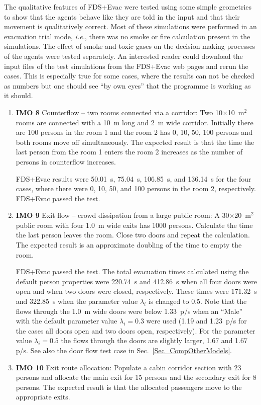 \documentclass[12pt,a4paper,final,twoside]{stylevk}
\begin{document}
\noindent The qualitative features of FDS+Evac were tested using some
simple geometries to show that the agents behave like they are told in
the input and that their movement is qualitatively correct.  Most of
these simulations were performed in an evacuation trial mode,
\emph{i.e.}, there was no smoke or fire calculation present in the
simulations.  The effect of smoke and toxic gases on the decision
making processes of the agents were tested separately.  An interested
reader could download the input files of the test simulations from the
FDS+Evac web pages and rerun the cases.  This is especially true for
some cases, where the results can not be checked as numbers but one
should see ``by own eyes'' that the programme is working as it should.

%
\begin{enumerate}
%
\item \textbf{IMO 8} Counterflow -- two rooms connected via a
  corridor: Two 10$\times$10~$\mathrm{m^2}$ rooms are connected with a
  10~m long and 2~m wide corridor.  Initially there are 100 persons in
  the room 1 and the room 2 has 0, 10, 50, 100 persons and both rooms
  move off simultaneously.  The expected result is that the time the
  last person from the room 1 enters the room 2 increases as the
  number of persons in counterflow increases.
  
  FDS+Evac results were 50.01~s, 75.04~s, 106.85~s, and 136.14~s for
  the four cases, where there were 0, 10, 50, and 100 persons in the
  room 2, respectively.  FDS+Evac passed the test.
%
\item \textbf{IMO 9} Exit flow -- crowd dissipation from a large
  public room: A 30$\times$20~$\mathrm{m^2}$ public room with four
  1.0~m wide exits has 1000 persons.  Calculate the time the last
  person leaves the room.  Close two doors and repeat the calculation.
  The expected result is an approximate doubling of the time to empty
  the room.
  
  FDS+Evac passed the test.  The total evacuation times calculated
  using the default person properties were 220.74~s and 412.86~s when
  all four doors were open and when two doors were closed,
  respectively.  These times were 171.32~s and 322.85~s when the
  parameter value $\lambda_i$ is changed to 0.5.  Note that the flows
  through the 1.0~m wide doors were below 1.33~p/s when an ``Male''
  with the default parameter value $\lambda_i = 0.3$ were used (1.19
  and 1.23~p/s for the cases all doors open and two doors open,
  respectively).  For the parameter value $\lambda_i = 0.5$ the flows
  through the doors are slightly larger, 1.67 and 1.67 p/s.  See also
  the door flow test case in Sec.~\ref{Sec_CompOtherModels}.
%
\item \textbf{IMO 10} Exit route allocation: Populate a cabin corridor
  section with 23 persons and allocate the main exit for 15 persons
  and the secondary exit for 8 persons.  The expected result is that
  the allocated passengers move to the appropriate exits.
  

\end{enumerate}
\end{document}
